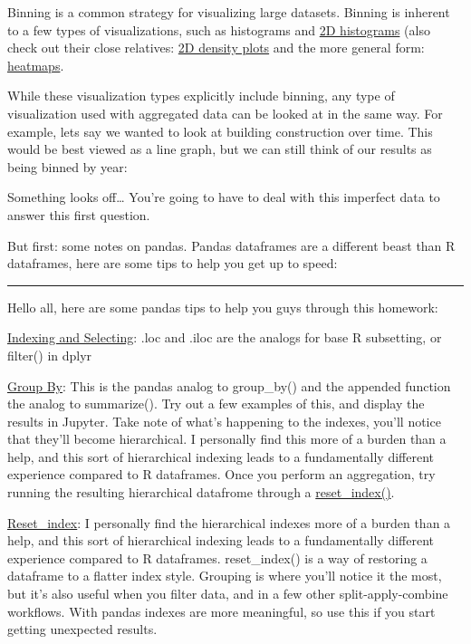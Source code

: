 \documentclass[11pt]{article}
\begin{document}
Binning is a common strategy for visualizing large datasets. Binning is
inherent to a few types of visualizations, such as histograms and
\href{https://plot.ly/python/2D-Histogram/}{2D histograms} (also check
out their close relatives:
\href{https://plot.ly/python/2d-density-plots/}{2D density plots} and
the more general form:
\href{https://plot.ly/python/heatmaps/}{heatmaps}.

While these visualization types explicitly include binning, any type of
visualization used with aggregated data can be looked at in the same
way. For example, lets say we wanted to look at building construction
over time. This would be best viewed as a line graph, but we can still
think of our results as being binned by year:

    
    
    Something looks off\ldots{} You're going to have to deal with this
imperfect data to answer this first question.

But first: some notes on pandas. Pandas dataframes are a different beast
than R dataframes, here are some tips to help you get up to speed:

\begin{center}\rule{0.5\linewidth}{0.5pt}\end{center}

Hello all, here are some pandas tips to help you guys through this
homework:

\href{https://pandas.pydata.org/pandas-docs/stable/indexing.html}{Indexing
and Selecting}: .loc and .iloc are the analogs for base R subsetting, or
filter() in dplyr

\href{https://pandas.pydata.org/pandas-docs/stable/groupby.html}{Group
By}: This is the pandas analog to group\_by() and the appended function
the analog to summarize(). Try out a few examples of this, and display
the results in Jupyter. Take note of what's happening to the indexes,
you'll notice that they'll become hierarchical. I personally find this
more of a burden than a help, and this sort of hierarchical indexing
leads to a fundamentally different experience compared to R dataframes.
Once you perform an aggregation, try running the resulting hierarchical
datafrome through a
\href{https://pandas.pydata.org/pandas-docs/stable/generated/pandas.DataFrame.reset_index.html}{reset\_index()}.

\href{https://pandas.pydata.org/pandas-docs/stable/generated/pandas.DataFrame.reset_index.html}{Reset\_index}:
I personally find the hierarchical indexes more of a burden than a help,
and this sort of hierarchical indexing leads to a fundamentally
different experience compared to R dataframes. reset\_index() is a way
of restoring a dataframe to a flatter index style. Grouping is where
you'll notice it the most, but it's also useful when you filter data,
and in a few other split-apply-combine workflows. With pandas indexes
are more meaningful, so use this if you start getting unexpected
results.
\end{document}
